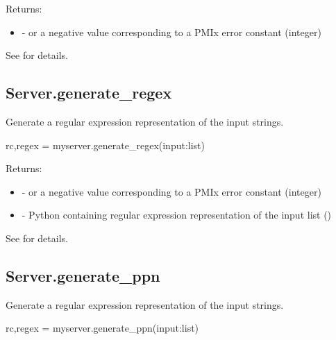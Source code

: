 Returns:

\begin{itemize}
    \item {} -  or a negative value corresponding to a PMIx error constant (integer)
\end{itemize}

See  for details.


\subsection{Server.generate_regex}

\summary
Generate a regular expression representation of the input strings.

\format

\pyspecificstart
\begin{codepar}
rc,regex = myserver.generate_regex(input:list)
\end{codepar}
\pyspecificend


\begin{arglist}
\end{arglist}

Returns:

\begin{itemize}
    \item {} -  or a negative value corresponding to a PMIx error constant (integer)
    \item {} - Python  containing regular expression representation of the input list ()
\end{itemize}

See  for details.


\subsection{Server.generate_ppn}

\summary
Generate a regular expression representation of the input strings.

\format

\pyspecificstart
\begin{codepar}
rc,regex = myserver.generate_ppn(input:list)
\end{codepar}
\pyspecificend


